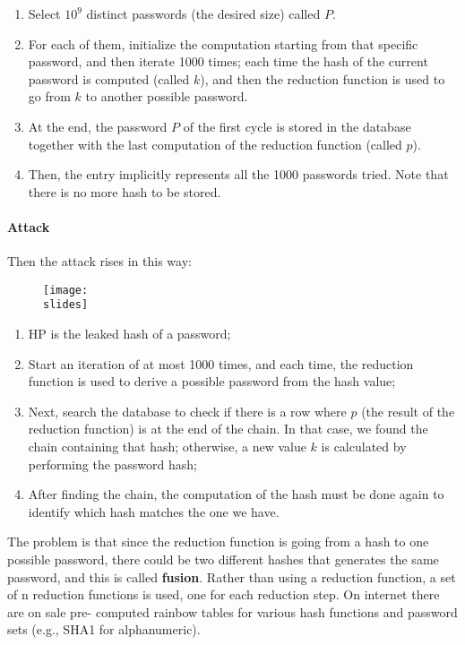 \begin{enumerate}
  \item Select $10^9$ distinct passwords (the desired size) called $P$.
  \item For each of them, initialize the computation starting from that specific password, and then iterate 1000 times; each time the hash of the current password is computed (called $k$), and then the reduction function is used to go from $k$ to another possible password.
  \item At the end, the password $P$ of the first cycle is stored in the database together with the last computation of the reduction function (called $p$).
  \item Then, the entry implicitly represents all the 1000 passwords tried. Note that there is no more hash to be stored.
\end{enumerate}


\paragraph*{Attack}
Then the attack rises in this way:
\begin{figure}[h]
  \centering
  \texttt{[image: \\slides]}
\end{figure}

\begin{enumerate}
  \item $\mathrm{HP}$ is the leaked hash of a password;
  \item Start an iteration of at most 1000 times, and each time, the reduction function is used to derive a possible password from the hash value;
  \item Next, search the database to check if there is a row where $p$ (the result of the reduction function) is at the end of the chain. In that case, we found the chain containing that hash; otherwise, a new value $k$ is calculated by performing the password hash;
  \item After finding the chain, the computation of the hash must be done again to identify which hash matches the one we have.
\end{enumerate}

The problem is that since the reduction function is going from a hash to one possible password, there could be
two different hashes that generates the same password, and this is called \textbf{fusion}. Rather than using a reduction
function, a set of n reduction functions is used, one for each reduction step. On internet there are on sale pre-
computed rainbow tables for various hash functions and password sets (e.g., SHA1 for alphanumeric).


